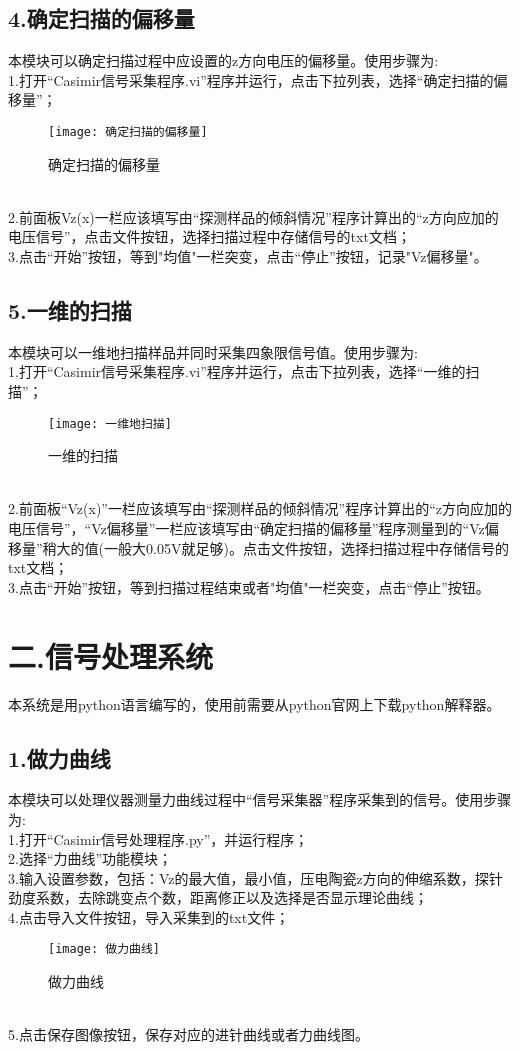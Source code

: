 \subsection*{4.确定扫描的偏移量}
本模块可以确定扫描过程中应设置的z方向电压的偏移量。使用步骤为:
\\1.打开“Casimir信号采集程序.vi”程序并运行，点击下拉列表，选择“确定扫描的偏移量”；
\begin{figure}[h]
	\centering
	\texttt{[image: 确定扫描的偏移量]}
	\caption{确定扫描的偏移量}
\end{figure}
\\2.前面板Vz(x)一栏应该填写由“探测样品的倾斜情况”程序计算出的“z方向应加的电压信号”，点击文件按钮，选择扫描过程中存储信号的txt文档；
\\3.点击“开始”按钮，等到"均值"一栏突变，点击“停止”按钮，记录"Vz偏移量"。
\subsection*{5.一维的扫描}
本模块可以一维地扫描样品并同时采集四象限信号值。使用步骤为:
\\1.打开“Casimir信号采集程序.vi”程序并运行，点击下拉列表，选择“一维的扫描”；
\begin{figure}[h]
	\centering
	\texttt{[image: 一维地扫描]}
	\caption{一维的扫描}
\end{figure}
\\2.前面板“Vz(x)”一栏应该填写由“探测样品的倾斜情况”程序计算出的“z方向应加的电压信号”，“Vz偏移量”一栏应该填写由“确定扫描的偏移量”程序测量到的“Vz偏移量”稍大的值(一般大0.05V就足够)。点击文件按钮，选择扫描过程中存储信号的txt文档；
\\3.点击“开始”按钮，等到扫描过程结束或者"均值"一栏突变，点击“停止”按钮。


\section*{二.信号处理系统}
本系统是用python语言编写的，使用前需要从python官网上下载python解释器。
\subsection*{1.做力曲线}
本模块可以处理仪器测量力曲线过程中“信号采集器”程序采集到的信号。使用步骤为:
\\1.打开“Casimir信号处理程序.py”，并运行程序；
\\2.选择“力曲线”功能模块；
\\3.输入设置参数，包括：Vz的最大值，最小值，压电陶瓷z方向的伸缩系数，探针劲度系数，去除跳变点个数，距离修正以及选择是否显示理论曲线；
\\4.点击导入文件按钮，导入采集到的txt文件；
\begin{figure}[h]
	\centering
	\texttt{[image: 做力曲线]}
	\caption{做力曲线}
\end{figure}
\\5.点击保存图像按钮，保存对应的进针曲线或者力曲线图。
